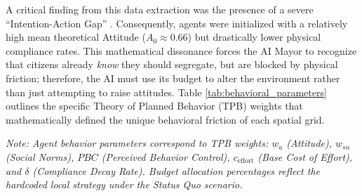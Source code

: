 A critical finding from this data extraction was the presence of a severe ``Intention-Action Gap'' \citep{Geiger2021}. Consequently, agents were initialized with a relatively high mean theoretical Attitude ($A_0 \approx 0.66$) but drastically lower physical compliance rates. This mathematical dissonance forces the AI Mayor to recognize that citizens already \textit{know} they should segregate, but are blocked by physical friction; therefore, the AI must use its budget to alter the environment rather than just attempting to raise attitudes. Table \ref{tab:behavioral_parameters} outlines the specific Theory of Planned Behavior (TPB) weights that mathematically defined the unique behavioral friction of each spatial grid.

\begin{table}[H]
    \centering
    \caption{Calibrated Behavioral Weights and Base-Layer Allocation Strategies}
    \label{tab:behavioral_parameters}
    \vspace{1ex}
    
    \raggedright
    \footnotesize
    \textit{Note: Agent behavior parameters correspond to TPB weights: $w_a$ (Attitude), $w_{sn}$ (Social Norms), $PBC$ (Perceived Behavior Control), $c_{\text{effort}}$ (Base Cost of Effort), and $\delta$ (Compliance Decay Rate). Budget allocation percentages reflect the hardcoded local strategy under the Status Quo scenario.}
\end{table}

